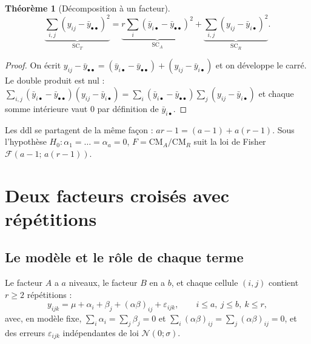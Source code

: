 \documentclass[11pt,a4paper]{article}
\theoremstyle{sj}
\newtheorem{thm}{Théorème}
\theoremstyle{definition}
\theoremstyle{remark}
\newcommand{\N}{\mathcal{N}}
\newcommand{\SC}{\mathrm{SC}}
\newcommand{\CM}{\mathrm{CM}}
\newcommand{\ybar}{\bar y}
\newcommand{\dotp}{{\scriptscriptstyle\bullet}}
\begin{document}
\begin{thm}[Décomposition à un facteur]
\[
\underbrace{\sum_{i,j}(y_{ij}-\ybar_{\dotp\dotp})^2}_{\SC_T}
=\underbrace{r\sum_i(\ybar_{i\dotp}-\ybar_{\dotp\dotp})^2}_{\SC_A}
+\underbrace{\sum_{i,j}(y_{ij}-\ybar_{i\dotp})^2}_{\SC_R}.
\]
\end{thm}

\begin{proof}
On écrit $y_{ij}-\ybar_{\dotp\dotp}=(\ybar_{i\dotp}-\ybar_{\dotp\dotp})+(y_{ij}-\ybar_{i\dotp})$ et on développe le carré. Le double produit est nul : $\sum_{i,j}(\ybar_{i\dotp}-\ybar_{\dotp\dotp})(y_{ij}-\ybar_{i\dotp})=\sum_i(\ybar_{i\dotp}-\ybar_{\dotp\dotp})\sum_j(y_{ij}-\ybar_{i\dotp})$ et chaque somme intérieure vaut $0$ par définition de $\ybar_{i\dotp}$.
\end{proof}

Les ddl se partagent de la même façon : $ar-1=(a-1)+a(r-1)$. Sous l'hypothèse $H_0:\alpha_1=\dots=\alpha_a=0$, $F=\CM_A/\CM_R$ suit la loi de Fisher $\mathcal F(a-1;\,a(r-1))$.

\section{Deux facteurs croisés avec répétitions}\label{sec:deux}

\subsection{Le modèle et le rôle de chaque terme}

Le facteur $A$ a $a$ niveaux, le facteur $B$ en a $b$, et chaque cellule $(i,j)$ contient $r\ge2$ répétitions :
\begin{equation}\label{eq:mod2}
y_{ijk}=\mu+\alpha_i+\beta_j+(\alpha\beta)_{ij}+\varepsilon_{ijk},\qquad i\le a,\ j\le b,\ k\le r,
\end{equation}
avec, en modèle fixe, $\sum_i\alpha_i=\sum_j\beta_j=0$ et $\sum_i(\alpha\beta)_{ij}=\sum_j(\alpha\beta)_{ij}=0$, et des erreurs $\varepsilon_{ijk}$ indépendantes de loi $\N(0;\sigma)$.
\end{document}
